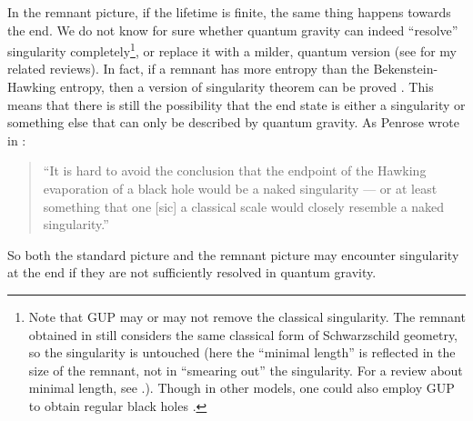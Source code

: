 \documentclass[preprintnumbers, floatfix, preprintnumbers, letterpaper, twocolumn, superscriptaddress,nofootinbib]{revtex4-2}
\begin{document}
In the remnant picture, if the lifetime is finite, the same thing happens towards the end. We do not know for sure whether quantum gravity can indeed ``resolve'' singularity completely\footnote{Note that GUP may or may not remove the classical singularity. The remnant obtained in \cite{0106080} still considers the same classical form of Schwarzschild geometry, so the singularity is untouched (here the ``minimal length'' is reflected in the size of the remnant, not in ``smearing out'' the singularity. For a review about minimal length, see \cite{1203.6191}.). Though in other models, one could also employ GUP to obtain regular black holes \cite{1305.3851,2109.05974}.}, or replace it with a milder, quantum version (see \cite{2005.07032,2210.16856} for my related reviews). In fact, if a remnant has more entropy than the Bekenstein-Hawking entropy, then a version of singularity theorem can be proved \cite{2201.11132}. 
This means that there is still the possibility that the end state is either a singularity or something else that can only be described by quantum gravity. As Penrose wrote in \cite{RP}: 
\begin{quote}``It
is hard to avoid the conclusion that the endpoint of the Hawking
evaporation of a black hole would be a naked singularity --- or at
least something that one [sic] a classical scale would closely resemble
a naked singularity.'' \end{quote}
So both the standard picture and the remnant picture may encounter singularity at the end if they are not sufficiently resolved in quantum gravity. 
\end{document}
